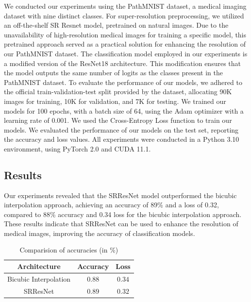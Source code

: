 \documentclass[10pt,twocolumn,letterpaper]{article}
\begin{document}

We conducted our experiments using the PathMNIST dataset, a medical imaging dataset with nine distinct classes. 
For super-resolution preprocessing, we utilized an off-the-shelf SR Resnet model, pretrained on natural images. Due to the unavailability of high-resolution medical images for training a specific model, this pretrained approach served as a practical solution for enhancing the resolution of our PathMNIST dataset.
The classification model employed in our experiments is a modified version of the ResNet18 architecture. This modification ensures that the model outputs the same number of logits as the classes present in the PathMNIST dataset.
To evaluate the performance of our models, we adhered to the official train-validation-test split provided by the dataset, allocating 90K images for training, 10K for validation, and 7K for testing.
We trained our models for 100 epochs, with a batch size of 64, using the Adam optimizer with a learning rate of 0.001. We used the Cross-Entropy Loss function to train our models.
We evaluated the performance of our models on the test set, reporting the accuracy and loss values. 
All experiments were conducted in a Python 3.10 environment, using PyTorch 2.0 and CUDA 11.1.

\subsection*{Results}
Our experiments revealed that the SRResNet model outperformed the bicubic interpolation approach, achieving an accuracy of 89\% and a loss of 0.32, compared to 88\% accuracy and 0.34 loss for the bicubic interpolation approach. These results indicate that SRResNet can be used to enhance the resolution of medical images, improving the accuracy of classification models.
\begin{table}[h]
    \centering
    \begin{tabular}{|| c | c | c ||}
        \hline
        Architecture & Accuracy & Loss \\
        \hline\hline
        Bicubic Interpolation & $0.88$  & $0.34$ \\
        \hline
        SRResNet &  $\mathbf{0.89} $ & $\mathbf{0.32}$ \\
        \hline
    \end{tabular}
    \caption{Comparision of accuracies (in \%) }
    \label{tab:my_label}
\end{table}
\end{document}
